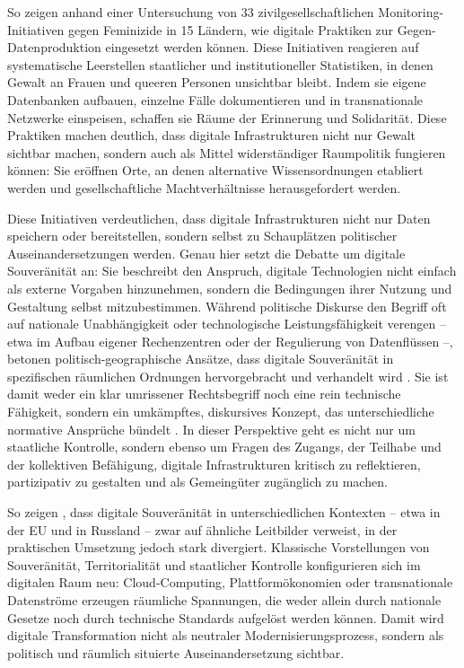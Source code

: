 So zeigen \textcite{dignazioGeographiesMissingData2024} anhand einer Untersuchung von 33 zivilgesellschaftlichen Monitoring-Initiativen gegen Feminizide in 15 Ländern, wie digitale Praktiken zur Gegen-Datenproduktion eingesetzt werden können. Diese Initiativen reagieren auf systematische Leerstellen staatlicher und institutioneller Statistiken, in denen Gewalt an Frauen und queeren Personen unsichtbar bleibt. Indem sie eigene Datenbanken aufbauen, einzelne Fälle dokumentieren und in transnationale Netzwerke einspeisen, schaffen sie Räume der Erinnerung und Solidarität. Diese Praktiken machen deutlich, dass digitale Infrastrukturen nicht nur Gewalt sichtbar machen, sondern auch als Mittel widerständiger Raumpolitik fungieren können: Sie eröffnen Orte, an denen alternative Wissensordnungen etabliert werden und gesellschaftliche Machtverhältnisse herausgefordert werden.

Diese Initiativen verdeutlichen, dass digitale Infrastrukturen nicht nur Daten speichern oder bereitstellen, sondern selbst zu Schauplätzen politischer Auseinandersetzungen werden. Genau hier setzt die Debatte um digitale Souveränität an: Sie beschreibt den Anspruch, digitale Technologien nicht einfach als externe Vorgaben hinzunehmen, sondern die Bedingungen ihrer Nutzung und Gestaltung selbst mitzubestimmen. Während politische Diskurse den Begriff oft auf nationale Unabhängigkeit oder technologische Leistungsfähigkeit verengen -- etwa im Aufbau eigener Rechenzentren oder der Regulierung von Datenflüssen --, betonen politisch-geographische Ansätze, dass digitale Souveränität in spezifischen räumlichen Ordnungen hervorgebracht und verhandelt wird \parencite{glaszeContestedSpatialitiesDigital2023}. Sie ist damit weder ein klar umrissener Rechtsbegriff noch eine rein technische Fähigkeit, sondern ein umkämpftes, diskursives Konzept, das unterschiedliche normative Ansprüche bündelt \parencite{pohleDigitalSovereignty2020}. In dieser Perspektive geht es nicht nur um staatliche Kontrolle, sondern ebenso um Fragen des Zugangs, der Teilhabe und der kollektiven Befähigung, digitale Infrastrukturen kritisch zu reflektieren, partizipativ zu gestalten und als Gemeingüter zugänglich zu machen.

So zeigen \textcite{glaszeContestedSpatialitiesDigital2023}, dass digitale Souveränität in unterschiedlichen Kontexten -- etwa in der EU und in Russland -- zwar auf ähnliche Leitbilder verweist, in der praktischen Umsetzung jedoch stark divergiert. Klassische Vorstellungen von Souveränität, Territorialität und staatlicher Kontrolle konfigurieren sich im digitalen Raum neu: Cloud-Computing, Plattformökonomien oder transnationale Datenströme erzeugen räumliche Spannungen, die weder allein durch nationale Gesetze noch durch technische Standards aufgelöst werden können. Damit wird digitale Transformation nicht als neutraler Modernisierungsprozess, sondern als politisch und räumlich situierte Auseinandersetzung sichtbar.

